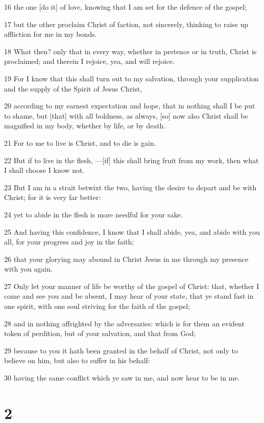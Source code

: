 \par 16 the one [do it] of love, knowing that I am set for the defence of the gospel;
\par 17 but the other proclaim Christ of faction, not sincerely, thinking to raise up affliction for me in my bonds.
\par 18 What then? only that in every way, whether in pretence or in truth, Christ is proclaimed; and therein I rejoice, yea, and will rejoice.
\par 19 For I know that this shall turn out to my salvation, through your supplication and the supply of the Spirit of Jesus Christ,
\par 20 according to my earnest expectation and hope, that in nothing shall I be put to shame, but [that] with all boldness, as always, [so] now also Christ shall be magnified in my body, whether by life, or by death.
\par 21 For to me to live is Christ, and to die is gain.
\par 22 But if to live in the flesh, —[if] this shall bring fruit from my work, then what I shall choose I know not.
\par 23 But I am in a strait betwixt the two, having the desire to depart and be with Christ; for it is very far better:
\par 24 yet to abide in the flesh is more needful for your sake.
\par 25 And having this confidence, I know that I shall abide, yea, and abide with you all, for your progress and joy in the faith;
\par 26 that your glorying may abound in Christ Jesus in me through my presence with you again.
\par 27 Only let your manner of life be worthy of the gospel of Christ: that, whether I come and see you and be absent, I may hear of your state, that ye stand fast in one spirit, with one soul striving for the faith of the gospel;
\par 28 and in nothing affrighted by the adversaries: which is for them an evident token of perdition, but of your salvation, and that from God;
\par 29 because to you it hath been granted in the behalf of Christ, not only to believe on him, but also to suffer in his behalf:
\par 30 having the same conflict which ye saw in me, and now hear to be in me.

\chapter{2}


